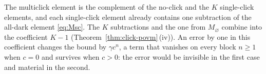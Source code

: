 
\begin{remark}\label{rem:k-minus-1}
The multiclick element is the complement of the no-click and the $K$
single-click elements, and each single-click element already contains one
subtraction of the all-dark element \eqref{eq:Msc}. The $K$ subtractions and
the one from $M_{\varnothing}$ combine into the coefficient $K-1$
(Theorem~\ref{thm:click-povm}\,(iv)). An error by one in this coefficient changes
the bound by $\gamma c^{n}$, a term that vanishes on every block $n\ge1$ when
$c=0$ and survives when $c>0$: the error would be invisible in the first case
and material in the second.
\end{remark}
